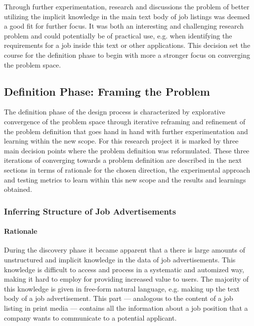 Through further experimentation, research and discussions the problem of better utilizing the implicit knowledge in the main text body of job listings was deemed a good fit for further focus. It was both an interesting and challenging research problem and could potentially be of practical use, e.g. when identifying the requirements for a job inside this text or other applications. This decision set the course for the definition phase to begin with more a stronger focus on converging the problem space.

\subsection{Definition Phase: Framing the Problem}
\label{sub:Definition Phase: Framing the Problem}

The definition phase of the design process is characterized by explorative convergence of the problem space through iterative reframing and refinement of the problem definition that goes hand in hand with further experimentation and learning within the new scope. For this research project it is marked by three main decision points where the problem definition was reformulated. These three iterations of converging towards a problem definition are described in the next sections in terms of rationale for the chosen direction, the experimental approach and testing metrics to learn within this new scope and the results and learnings obtained.

\subsubsection{Inferring Structure of Job Advertisements}
\label{subs:Inferring Structure in Job Advertisements}

\paragraph{Rationale}
\label{par:Rationale}

During the discovery phase it became apparent that a there is large amounts of unstructured and implicit knowledge in the data of job advertisements. This knowledge is difficult to access and process in a systematic and automized way, making it hard to employ for providing increased value to users. The majority of this knowledge is given in free-form natural language, e.g. making up the text body of a job advertisement. This part --- analogous to the content of a job listing in print media --- contains all the information about a job position that a company wants to communicate to a potential applicant. 

